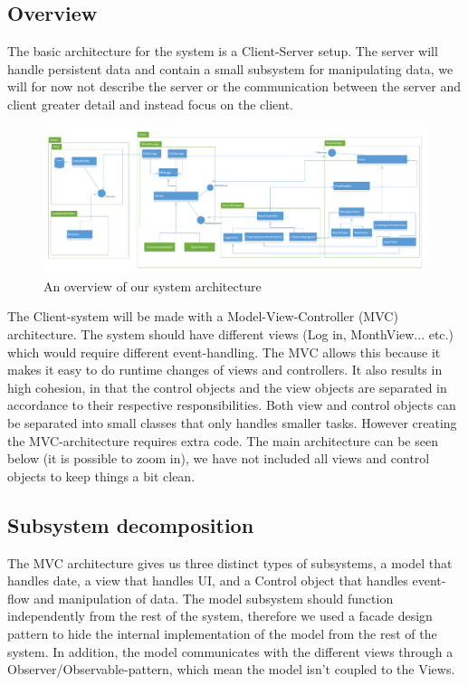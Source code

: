 \subsection{Overview}
The basic architecture for the system is a Client-Server setup. The server will handle persistent data and contain a small subsystem for manipulating data, we will for now not describe the server or the communication between the server and client greater detail and instead focus on the client.\\

\begin{figure}[ht]
\centering
\includegraphics[scale=.35]{sections/Architecture.pdf}
\caption{An overview of our system architecture}
\end{figure}

The Client-system will be made with a Model-View-Controller (MVC) architecture. The system should have different views (Log in, MonthView... etc.) which would require different event-handling. The MVC allows this because it makes it easy to do runtime changes of views and controllers. It also results in high cohesion, in that the control objects and the view objects are separated in accordance to their respective responsibilities. Both view and control objects can be separated into small classes that only handles smaller tasks. However creating the MVC-architecture requires extra code. The main architecture can be seen below (it is possible to zoom in), we have not included all views and control objects to keep things a bit clean.


\subsection{Subsystem decomposition}
The MVC architecture gives us three distinct types of subsystems, a model that handles date, a view that handles UI, and a Control object that handles event-flow and manipulation of data. The model subsystem should function independently from the rest of the system, therefore we used a facade design pattern to hide the internal implementation of the model from the rest of the system. In addition, the model communicates with the different views through a Observer/Observable-pattern, which mean the model isn't coupled to the Views.\\

